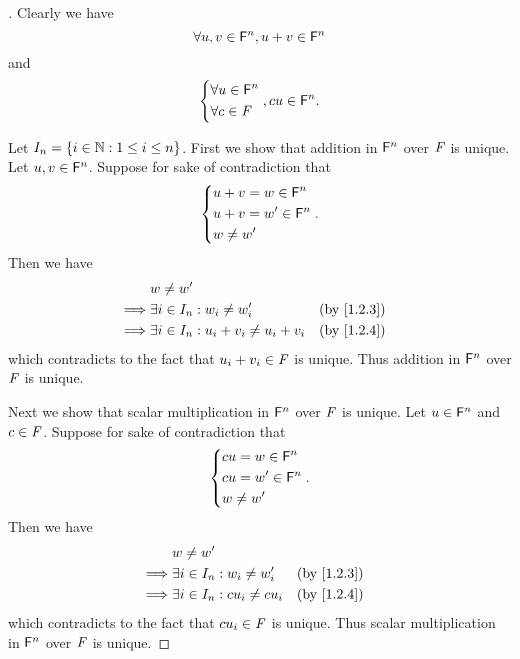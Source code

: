 \begin{proof}[]
  Clearly we have
  \[
    \forall u, v \in \mathsf{F}^n, u + v \in \mathsf{F}^n
  \]
  and
  \[
    \begin{dcases}
      \forall u \in \mathsf{F}^n \\
      \forall c \in \mathit{F}
    \end{dcases}, cu \in \mathsf{F}^n.
  \]

  Let \(I_n = \left\lbrace i \in \mathbb{N} : 1 \leq i \leq n\right\rbrace\).
  First we show that addition in \(\mathsf{F}^n\) over \(\mathit{F}\) is unique.
  Let \(u, v \in \mathsf{F}^n\).
  Suppose for sake of contradiction that
  \[
    \begin{dcases}
      u + v = w \in \mathsf{F}^n  \\
      u + v = w' \in \mathsf{F}^n \\
      w \neq w'
    \end{dcases}.
  \]
  Then we have
  \begin{align*}
             & w \neq w'                                                    \\
    \implies & \exists i \in I_n : w_i \neq w_i'            &  & \by{1.2.3} \\
    \implies & \exists i \in I_n : u_i + v_i \neq u_i + v_i &  & \by{1.2.4}
  \end{align*}
  which contradicts to the fact that \(u_i + v_i \in \mathit{F}\) is unique.
  Thus addition in \(\mathsf{F}^n\) over \(\mathit{F}\) is unique.

  Next we show that scalar multiplication in \(\mathsf{F}^n\) over \(\mathit{F}\) is unique.
  Let \(u \in \mathsf{F}^n\) and \(c \in \mathit{F}\).
  Suppose for sake of contradiction that
  \[
    \begin{dcases}
      cu = w \in \mathsf{F}^n  \\
      cu = w' \in \mathsf{F}^n \\
      w \neq w'
    \end{dcases}.
  \]
  Then we have
  \begin{align*}
             & w \neq w'                                            \\
    \implies & \exists i \in I_n : w_i \neq w_i'    &  & \by{1.2.3} \\
    \implies & \exists i \in I_n : c u_i \neq c u_i &  & \by{1.2.4}
  \end{align*}
  which contradicts to the fact that \(c u_i \in \mathit{F}\) is unique.
  Thus scalar multiplication in \(\mathsf{F}^n\) over \(\mathit{F}\) is unique.


\end{proof}
